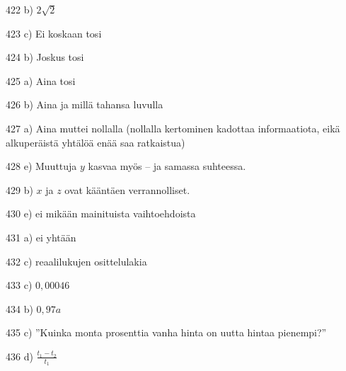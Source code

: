 \begin{Vastaus}{422}
	 b) $2\sqrt{2}$
    
\end{Vastaus}
\begin{Vastaus}{423}
c) Ei koskaan tosi
\end{Vastaus}
\begin{Vastaus}{424}
b) Joskus tosi
\end{Vastaus}
\begin{Vastaus}{425}
a) Aina tosi
\end{Vastaus}
\begin{Vastaus}{426}
b) Aina ja millä tahansa luvulla
	
\end{Vastaus}
\begin{Vastaus}{427}
a) Aina muttei nollalla (nollalla kertominen kadottaa informaatiota, eikä alkuperäistä yhtälöä enää saa ratkaistua)
\end{Vastaus}
\begin{Vastaus}{428}
e) Muuttuja $y$ kasvaa myös -- ja samassa suhteessa.
\end{Vastaus}
\begin{Vastaus}{429}
b) $x$ ja $z$ ovat kääntäen verrannolliset.
	
\end{Vastaus}
\begin{Vastaus}{430}
e) ei mikään mainituista vaihtoehdoista
	
\end{Vastaus}
\begin{Vastaus}{431}
a) ei yhtään
	
\end{Vastaus}
\begin{Vastaus}{432}
	c) reaalilukujen osittelulakia
	
\end{Vastaus}
\begin{Vastaus}{433}
	c) $0,00046$
	
\end{Vastaus}
\begin{Vastaus}{434}
b) $0,97a$
	
\end{Vastaus}
\begin{Vastaus}{435}
c) ''Kuinka monta prosenttia vanha hinta on uutta hintaa pienempi?''
	
\end{Vastaus}
\begin{Vastaus}{436}
d) $\frac{t_1-t_2}{t_1}$
	
\end{Vastaus}
